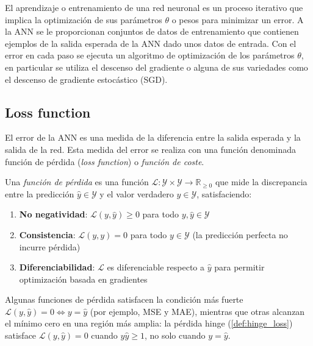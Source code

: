 El aprendizaje o entrenamiento de una red neuronal es un proceso iterativo que implica la optimización de sus parámetros \(\theta\) o pesos para minimizar un error. A la \gls{ANN} se le proporcionan conjuntos de datos de entrenamiento que contienen ejemplos de la salida esperada de la \gls{ANN} dado unos datos de entrada. Con el error en cada paso se ejecuta un algoritmo de optimización de los parámetros \(\theta\), en particular se utiliza el descenso del gradiente o alguna de sus variedades como el descenso de gradiente estocástico (\gls{SGD}).

\subsection{Loss function}

El error de la \gls{ANN} es una medida de la diferencia entre la salida esperada y la salida de la red. Esta medida del error se realiza con una función denominada función de pérdida (\emph{loss function}) o \textit{función de coste}.

\begin{definition}\label{def:funcion_perdida}
	Una \textit{función de pérdida} es una función \(\mathcal{L}: \mathcal{Y} \times \mathcal{Y} \to \mathbb{R}_{\geq 0}\) que mide la discrepancia entre la predicción \(\hat{y} \in \mathcal{Y}\) y el valor verdadero \(y \in \mathcal{Y}\), satisfaciendo:
	\begin{enumerate}
		\item \textbf{No negatividad}: \(\mathcal{L}(y, \hat{y}) \geq 0\) para todo \(y, \hat{y} \in \mathcal{Y}\)
		\item \textbf{Consistencia}: \(\mathcal{L}(y, y) = 0\) para todo \(y \in \mathcal{Y}\) (la predicción perfecta no incurre pérdida)
		\item \textbf{Diferenciabilidad}: \(\mathcal{L}\) es diferenciable respecto a \(\hat{y}\) para permitir optimización basada en gradientes
	\end{enumerate}
\end{definition}

\begin{remark}
Algunas funciones de pérdida satisfacen la condición más fuerte \(\mathcal{L}(y, \hat{y}) = 0 \iff y = \hat{y}\) (por ejemplo, MSE y MAE), mientras que otras alcanzan el mínimo cero en una región más amplia: la pérdida hinge (\autoref{def:hinge_loss}) satisface \(\mathcal{L}(y, \hat{y}) = 0\) cuando \(y \hat{y} \geq 1\), no solo cuando \(y = \hat{y}\).
\end{remark}

